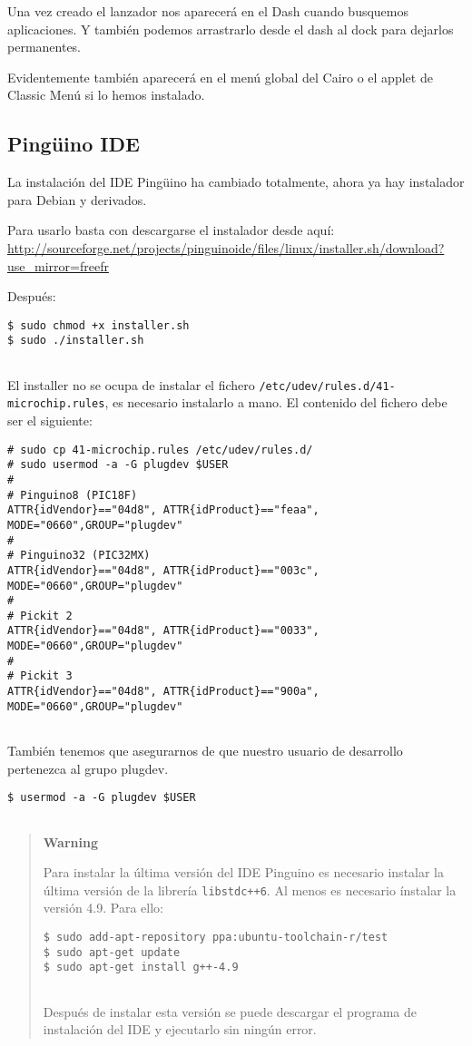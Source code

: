 Una vez creado el lanzador nos aparecerá en el Dash cuando busquemos
aplicaciones. Y también podemos arrastrarlo desde el dash al dock para
dejarlos permanentes.

Evidentemente también aparecerá en el menú global del Cairo o el applet
de Classic Menú si lo hemos instalado.

\subsection{Pingüino IDE}\label{pinguxfcino-ide}

La instalación del IDE Pingüino ha cambiado totalmente, ahora ya hay
instalador para Debian y derivados.

Para usarlo basta con descargarse el instalador desde aquí:
\url{http://sourceforge.net/projects/pinguinoide/files/linux/installer.sh/download?use_mirror=freefr}

Después:

\begin{verbatim}
$ sudo chmod +x installer.sh
$ sudo ./installer.sh
      
\end{verbatim}

El installer no se ocupa de instalar el fichero
\texttt{/etc/udev/rules.d/41-microchip.rules}, es necesario instalarlo a
mano. El contenido del fichero debe ser el siguiente:

\begin{verbatim}
# sudo cp 41-microchip.rules /etc/udev/rules.d/
# sudo usermod -a -G plugdev $USER
#
# Pinguino8 (PIC18F)
ATTR{idVendor}=="04d8", ATTR{idProduct}=="feaa", MODE="0660",GROUP="plugdev"
#
# Pinguino32 (PIC32MX)
ATTR{idVendor}=="04d8", ATTR{idProduct}=="003c", MODE="0660",GROUP="plugdev"
#
# Pickit 2
ATTR{idVendor}=="04d8", ATTR{idProduct}=="0033", MODE="0660",GROUP="plugdev"
#
# Pickit 3
ATTR{idVendor}=="04d8", ATTR{idProduct}=="900a", MODE="0660",GROUP="plugdev"
      
\end{verbatim}

También tenemos que asegurarnos de que nuestro usuario de desarrollo
pertenezca al grupo plugdev.

\begin{verbatim}
$ usermod -a -G plugdev $USER
      
\end{verbatim}

\begin{quote}
\textbf{Warning}

Para instalar la última versión del IDE Pinguino es necesario instalar
la última versión de la librería \texttt{libstdc++6}. Al menos es
necesario ínstalar la versión 4.9. Para ello:

\begin{verbatim}
$ sudo add-apt-repository ppa:ubuntu-toolchain-r/test
$ sudo apt-get update
$ sudo apt-get install g++-4.9
        
\end{verbatim}

Después de instalar esta versión se puede descargar el programa de
instalación del IDE y ejecutarlo sin ningún error.
\end{quote}

